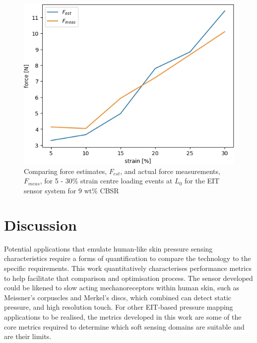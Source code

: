 \begin{figure}[H]
    \centering
    \includegraphics[width=0.7\linewidth]{Figures/CBSR_9p_2_9push_XXstrain_60s_1mA_3_force_est_frame31.jpg}
    \caption{Comparing force estimates, $F_{est}$, and actual force measurements, $F_{meas}$, for 5 - 30\% strain centre loading events at $L_0$ for the EIT sensor system for 9 wt\% CBSR}
    \label{fig:stress_est_9p_3}
\end{figure}


\section{Discussion}\label{sec:Discussion}
Potential applications that emulate human-like skin pressure sensing characteristics require a forms of quantification to compare the technology to the specific requirements. This work quantitatively characterises performance metrics to help facilitate that comparison and optimisation process. The sensor developed could be likened to slow acting mechanoreceptors within human skin, such as Meissner's corpuscles and Merkel's discs, which combined can detect static pressure, and high resolution touch. For other EIT-based pressure mapping applications to be realised, the metrics developed in this work are some of the core metrics required to determine which soft sensing domains are suitable and are their limits.

